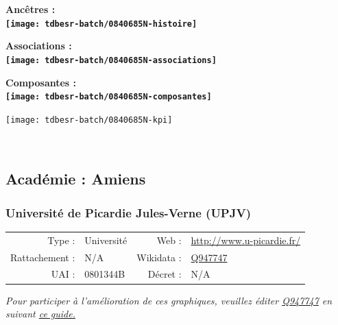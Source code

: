 \documentclass[12pt,french,]{article}
\begin{document}
\vspace{1cm}  
\begin{minipage}[b]{0.50\textwidth}\begin{center} \bf Ancêtres : \\  
\texttt{[image: tdbesr-batch/0840685N-histoire]} \end{center}\end{minipage}\begin{minipage}[b]{0.50\textwidth}\begin{center} \bf Associations : \\  
\texttt{[image: tdbesr-batch/0840685N-associations]} \end{center}\end{minipage}

\hrulefill

\begin{center} \bf Composantes : \\  
\texttt{[image: tdbesr-batch/0840685N-composantes]} \end{center}

\begin{center}\texttt{[image: tdbesr-batch/0840685N-kpi]} \end{center}\checkoddpage

\ifoddpage ~\newpage \fi   

\hypertarget{acaduxe9mie-amiens}{%
\subsection{Académie : Amiens}\label{acaduxe9mie-amiens}}

\hypertarget{universituxe9-de-picardie-jules-verne-upjv}{%
\subsubsection{Université de Picardie Jules-Verne
(UPJV)}\label{universituxe9-de-picardie-jules-verne-upjv}}

\begin{tabular*}{\textwidth}{rp{5cm}rl}  
\hline  
Type : & Université & Web : &\href{http://www.u-picardie.fr/}{http://www.u-picardie.fr/} \\  
Rattachement : & N/A & Wikidata : & \href{https://www.wikidata.org/entity/Q947747}{Q947747} \\  
UAI : & 0801344B & Décret : & N/A \\  
\hline  
\end{tabular*}

\textit{\scriptsize Pour participer à l'amélioration de ces graphiques, veuillez éditer  \href{https://www.wikidata.org/entity/Q947747}{Q947747}  en suivant \href{https://github.com/cpesr/wikidataESR/blob/master/Rmd/wikidataESR.md}{ce guide.}}
\end{document}
